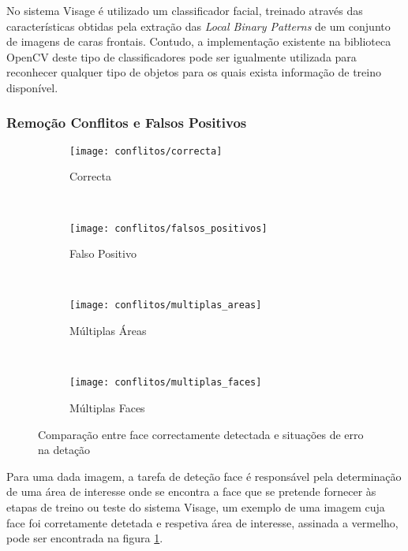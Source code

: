 No sistema Visage é utilizado um classificador facial, treinado através das características obtidas pela extração das \textit{Local Binary Patterns} \cite{Ahonen2006} de um conjunto de imagens de caras frontais. Contudo, a implementação existente na biblioteca OpenCV deste tipo de classificadores pode ser igualmente utilizada para reconhecer qualquer tipo de objetos para os quais exista informação de treino disponível.

\subsubsection*{Remoção Conflitos e Falsos Positivos}

\begin{figure}[t]
        \centering
        \begin{subfigure}[b]{0.2\textwidth}
                \centering
                \texttt{[image: conflitos/correcta]}
                \caption{Correcta}
                \label{fig:conflitos-correcta}
        \end{subfigure}%
        ~ 
        \begin{subfigure}[b]{0.2\textwidth}
                \centering
                \texttt{[image: conflitos/falsos\_positivos]}
                \caption{Falso Positivo}
                \label{fig:conflitos-falsos_positivos}
        \end{subfigure}
        ~ 
        \begin{subfigure}[b]{0.2\textwidth}
                \centering
                \texttt{[image: conflitos/multiplas\_areas]}
                \caption{Múltiplas Áreas}
                \label{fig:conflitos-multiplas_areas}
        \end{subfigure}
        ~ 
        \begin{subfigure}[b]{0.2\textwidth}
                \centering
                \texttt{[image: conflitos/multiplas\_faces]}
                \caption{Múltiplas Faces}
                \label{fig:conflitos-multiplas_faces}
        \end{subfigure}
        \caption{Comparação entre face correctamente detectada e situações de erro na detação}\label{fig:conflitos-detecao}
\end{figure}

Para uma dada imagem, a tarefa de deteção face é responsável pela determinação de uma área de interesse onde se encontra a face que se pretende fornecer às etapas de treino ou teste do sistema Visage, um exemplo de uma imagem cuja face foi corretamente detetada e respetiva área de interesse, assinada a vermelho, pode ser encontrada na figura \ref{fig:conflitos-correcta}.


